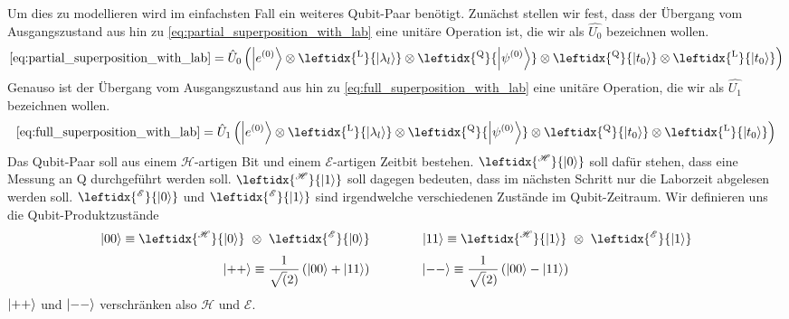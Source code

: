 \documentclass[12pt]{article}
\begin{document}
Um dies zu modellieren wird im einfachsten Fall ein weiteres Qubit-Paar benötigt. Zunächst stellen wir fest, dass der Übergang vom Ausgangszustand aus hin zu   \eqref{eq:partial_superposition_with_lab} eine unitäre Operation ist, die wir als $\hat{U_0}$ bezeichnen wollen.
\begin{equation}
\eqref{eq:partial_superposition_with_lab} = \hat{U}_0
\left(
\ket{e^{(0)}} 
\otimes \leftidx{^\mathrm{L}}{\ket{\lambda_l}} 
\otimes \leftidx{^\mathrm{Q}}{\ket{\psi^{(0)}}}
\otimes \leftidx{^\mathrm{Q}}{\ket{t_0}}
\otimes \leftidx{^\mathrm{L}}{\ket{t_0}}
\right)
\end{equation} 
Genauso ist der Übergang vom Ausgangszustand aus hin zu \eqref{eq:full_superposition_with_lab} eine unitäre Operation, die wir als $\hat{U_1}$ bezeichnen wollen.
\begin{equation}
\eqref{eq:full_superposition_with_lab} = \hat{U}_1
\left(
\ket{e^{(0)}} 
\otimes \leftidx{^\mathrm{L}}{\ket{\lambda_l}} 
\otimes \leftidx{^\mathrm{Q}}{\ket{\psi^{(0)}}}
\otimes \leftidx{^\mathrm{Q}}{\ket{t_0}}
\otimes \leftidx{^\mathrm{L}}{\ket{t_0}}
\right)
\end{equation} 
Das Qubit-Paar soll aus einem $\mathscr{H}$-artigen Bit und einem $\mathscr{E}$-artigen Zeitbit bestehen. $\leftidx{^\mathscr{H}}{\ket{0}}$ soll dafür stehen, dass eine Messung an Q durchgeführt werden soll. $\leftidx{^\mathscr{H}}{\ket{1}}$ soll dagegen bedeuten, dass im nächsten Schritt nur die Laborzeit abgelesen werden soll. $\leftidx{^\mathscr{E}}{\ket{0}}$ und $\leftidx{^\mathscr{E}}{\ket{1}}$ sind irgendwelche verschiedenen Zustände im Qubit-Zeitraum. Wir definieren uns die Qubit-Produktzustände
\begin{equation*}
\ket{00} \equiv \leftidx{^\mathscr{H}}{\ket{0}}\ \otimes\ \leftidx{^\mathscr{E}}{\ket{0}}
\quad\quad\quad\quad
\ket{11} \equiv \leftidx{^\mathscr{H}}{\ket{1}}\ \otimes\ \leftidx{^\mathscr{E}}{\ket{1}}
\end{equation*}
\begin{equation*}
\ket{++} \equiv \frac{1}{\sqrt(2)}\left(\ket{00}+\ket{11}\right)
\quad\quad\quad\quad
\ket{--} \equiv \frac{1}{\sqrt(2)}\left(\ket{00}-\ket{11}\right)
\end{equation*}
$\ket{++}$ und $\ket{--}$ verschränken also $\mathscr{H}$ und $\mathscr{E}$.
\end{document}
